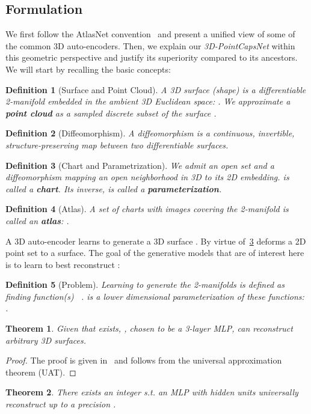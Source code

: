 \documentclass[10pt,twocolumn,letterpaper]{article}
\theoremstyle{break}
\newtheorem{thm}{Theorem}
\newtheorem{dfn}{Definition}
\begin{document}
\subsection{Formulation}
We first follow the AtlasNet convention~\cite{groueix2018} and present a unified view of some of the common 3D auto-encoders. Then, we explain our \textit{3D-PointCapsNet} within this geometric perspective and justify its superiority compared to its ancestors. We will start by recalling the basic concepts:
\begin{dfn}[Surface and Point Cloud]
\label{dfn:surface}
A 3D surface (\textit{shape}) is a differentiable 2-manifold embedded in the ambient 3D Euclidean space: . We approximate a \textbf{point cloud} as a sampled discrete subset of the surface .
\end{dfn}
\begin{dfn}[Diffeomorphism]
\label{dfn:diff}
A diffeomorphism is a continuous, invertible, structure-preserving map between two differentiable surfaces.
\end{dfn}
\begin{dfn}[Chart and Parametrization]
\label{dfn:chart}
We admit an open set  and a diffeomorphism  mapping an open neighborhood in 3D to its 2D embedding.  is called a \textbf{chart}. Its inverse,  is called a \textbf{parameterization}.
\end{dfn}
\begin{dfn}[Atlas]
\label{dfn:atlas}
A set of charts with images covering the 2-manifold is called an \textbf{atlas}: .
\end{dfn}
\noindent A 3D auto-encoder learns to generate a 3D surface . By virtue of~\cref{dfn:chart}  deforms a 2D point set to a surface. The goal of the generative models that are of interest here is to learn  to best reconstruct :
\begin{dfn}[Problem]
\label{dfn:problem}
Learning to generate the 2-manifolds is defined as finding function(s) ~\cite{groueix2018}.  is a lower dimensional parameterization of these functions: .
\end{dfn}
\begin{thm}
\label{thm:folding}
Given that  exists, , chosen to be a 3-layer MLP, can reconstruct arbitrary 3D surfaces.
\end{thm}
\begin{proof}
The proof is given in~\cite{Yang_2018_CVPR} and follows from the universal approximation theorem (UAT).
\end{proof}
\begin{thm}
\label{thm:atlasnet2}
There exists an integer  s.t. an MLP with  hidden units universally reconstruct  up to a precision .
\end{thm}
\end{document}
